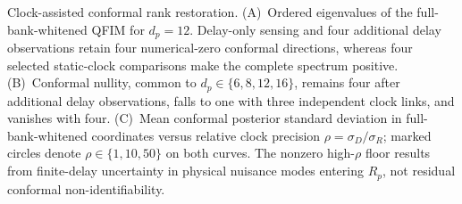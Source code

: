 \caption{Clock-assisted conformal rank restoration.
(A)~Ordered eigenvalues of the full-bank-whitened QFIM for $d_p=12$. Delay-only
sensing and four additional delay observations retain four numerical-zero
conformal directions, whereas four selected static-clock comparisons make the
complete spectrum positive.
(B)~Conformal nullity, common to $d_p\in\{6,8,12,16\}$, remains four after
additional delay observations, falls to one with three independent clock links,
and vanishes with four.
(C)~Mean conformal posterior standard deviation in full-bank-whitened
coordinates versus relative clock precision $\rho=\sigma_D/\sigma_R$; marked
circles denote $\rho\in\{1,10,50\}$ on both curves. The nonzero high-$\rho$
floor results from finite-delay uncertainty in physical nuisance modes entering
$R_p$, not residual conformal non-identifiability.}
